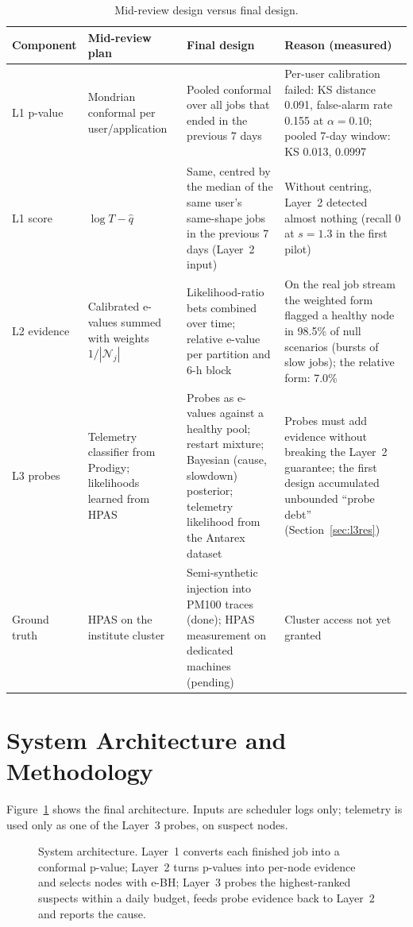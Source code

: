 \documentclass[10pt,a4paper]{article}
\begin{document}
\begin{table}[H]
\centering
\caption{Mid-review design versus final design.}
\label{tab:changes}
\small
\begin{tabularx}{\textwidth}{@{}p{1.6cm}XXX@{}}
\toprule
Component & Mid-review plan & Final design & Reason (measured) \\
\midrule
L1 p-value & Mondrian conformal per user/application & Pooled conformal over all jobs that ended in the previous 7 days & Per-user calibration failed: KS distance 0.091, false-alarm rate 0.155 at $\alpha = 0.10$; pooled 7-day window: KS 0.013, 0.0997 \\
L1 score & $\log T - \hat q$ & Same, centred by the median of the same user's same-shape jobs in the previous 7 days (Layer~2 input) & Without centring, Layer~2 detected almost nothing (recall 0 at $s = 1.3$ in the first pilot) \\
L2 evidence & Calibrated e-values summed with weights $1/|\mathcal N_j|$ & Likelihood-ratio bets combined over time; relative e-value per partition and 6-h block & On the real job stream the weighted form flagged a healthy node in 98.5\% of null scenarios (bursts of slow jobs); the relative form: 7.0\% \\
L3 probes & Telemetry classifier from Prodigy; likelihoods learned from HPAS & Probes as e-values against a healthy pool; restart mixture; Bayesian (cause, slowdown) posterior; telemetry likelihood from the Antarex dataset & Probes must add evidence without breaking the Layer~2 guarantee; the first design accumulated unbounded ``probe debt'' (Section~\ref{sec:l3res}) \\
Ground truth & HPAS on the institute cluster & Semi-synthetic injection into PM100 traces (done); HPAS measurement on dedicated machines (pending) & Cluster access not yet granted \\
\bottomrule
\end{tabularx}
\end{table}

\section{System Architecture and Methodology}
Figure~\ref{fig:arch} shows the final architecture. Inputs are scheduler logs only; telemetry is used only as one of the Layer~3 probes, on suspect nodes.

\begin{figure}[H]
\centering
\resizebox{\textwidth}{!}{}
\caption{System architecture. Layer~1 converts each finished job into a conformal p-value; Layer~2 turns p-values into per-node evidence and selects nodes with e-BH; Layer~3 probes the highest-ranked suspects within a daily budget, feeds probe evidence back to Layer~2 and reports the cause.}
\label{fig:arch}
\end{figure}
\end{document}
